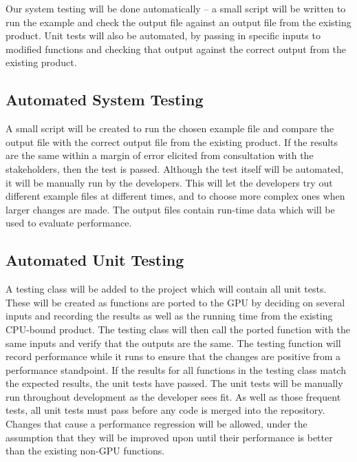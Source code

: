 \documentclass[12pt]{article}
\begin{document}
Our system testing will be done automatically -- a small script will be written to run the example and check the output file against an output file from the existing product. Unit tests will also be automated, by passing in specific inputs to modified functions and checking that output against the correct output from the existing product.

\subsection{Automated System Testing}
A small script will be created to run the chosen example file and compare the output file with the correct output file from the existing product. If the results are the same within a margin of error elicited from consultation with the stakeholders, then the test is passed. Although the test itself will be automated, it will be manually run by the developers. This will let the developers try out different example files at different times, and to choose more complex ones when larger changes are made. The output files contain run-time data which will be used to evaluate performance.

\subsection{Automated Unit Testing}
A testing class will be added to the project which will contain all unit tests. These will be created as functions are ported to the GPU by deciding on several inputs and recording the results as well as the running time from the existing CPU-bound product. The testing class will then call the ported function with the same inputs and verify that the outputs are the same. The testing function will record performance while it runs to ensure that the changes are positive from a performance standpoint. If the results for all functions in the testing class match the expected results, the unit tests have passed. The unit tests will be manually run throughout development as the developer sees fit. As well as those frequent tests, all unit tests must pass before any code is merged into the repository. Changes that cause a performance regression will be allowed, under the assumption that they will be improved upon until their performance is better than the existing non-GPU functions.

\end{document}
